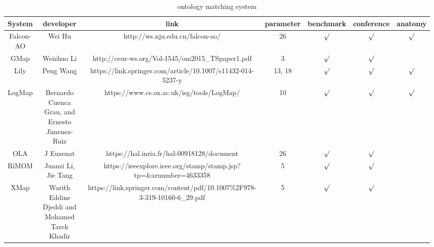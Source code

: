 \documentclass[twoside]{article}
\begin{document}

\begin{table}[ht]
\centering
\caption{ontology matching system}
\label{table:om_sys}
\begin{tabular}{@{}ccccccc@{}}
\toprule
System		& developer											& link																& parameter		& benchmark		& conference	& anatomy	        \\ \midrule
Falcon-AO	& Wei Hu											& http://ws.nju.edu.cn/falcon-ao/									& 26			& $\surd$		& $\surd$				& $\surd$	\\
GMap		& Weizhuo Li 										& http://ceur-ws.org/Vol-1545/om2015\_TSpaper1.pdf					& 3				& $\surd$		& $\surd$				&  			\\
Lily		& Peng Wang											& https://link.springer.com/article/10.1007/s11432-014-5237-y		& 13, 18		& $\surd$		& $\surd$				& $\surd$	\\
LogMap		& Bernardo Cuenca Grau, and Ernesto Jimenez-Ruiz	& https://www.cs.ox.ac.uk/isg/tools/LogMap/ 						& 10			& $\surd$		& $\surd$				& $\surd$	\\
OLA			& J Euzenat		 									& https://hal.inria.fr/hal-00918128/document 						& 26			& $\surd$		& $\surd$				&  			\\
RiMOM		& Juanzi Li, Jie Tang								& https://ieeexplore.ieee.org/stamp/stamp.jsp?tp=\&arnumber=4633358	& 5				& $\surd$		&  $\surd$				&  	 		\\
XMap		& Warith Eddine Djeddi and Mohamed Tarek Khadir 	& https://link.springer.com/content/pdf/10.1007\%2F978-3-319-10160-6\_29.pdf& 5		& $\surd$		&   $\surd$				&  			\\ \bottomrule
\end{tabular}
\end{table}
\end{document}
